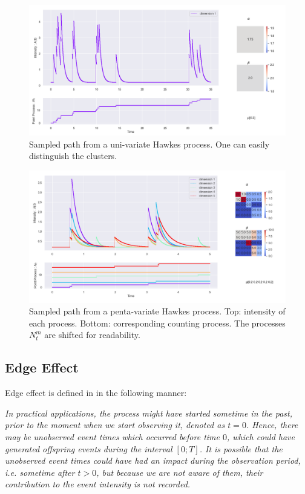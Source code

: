 \begin{figure}
\centering
\includegraphics[width = 0.99 \textwidth]{../imag/chap1/hawkes1.png}
\caption{Sampled path from a uni-variate Hawkes process. One can easily distinguish the clusters.}
\label{fig:hawkes1}
\end{figure}


\begin{figure}
\centering
\includegraphics[width = 0.99 \textwidth]{../imag/chap1/hawkes5.png}
\caption{Sampled path from a penta-variate Hawkes process. Top: intensity of each process. Bottom: corresponding counting process. The processes $N_t^m$ are shifted for readability.}
\label{fig:hawkes5}
\end{figure}

\subsection{Edge Effect}
\label{subsection:edge}
Edge effect is defined in \cite{socialhawkes} in the following manner:

\textit{In practical applications, the process might have started sometime in the past, prior to the moment when we start observing it, denoted as $t = 0$. Hence, there may be unobserved event times which occurred before time $0$, which could have generated offspring events during the interval $[0;T]$. It is possible that the unobserved event times could have had an impact during the observation period, i.e. sometime after $t > 0$, but because we are not aware of them, their contribution to the event intensity is not recorded.}


